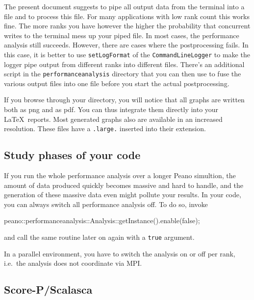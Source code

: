 \begin{remark}
The present document suggests to pipe all output data from the terminal into a
file and to process this file. 
For many applications with low rank count this works fine.
The more ranks you have however the higher the probability that concurrent
writes to the terminal mess up your piped file.
In most cases, the performance analysis still succeeds. 
However, there are cases where the postprocessing fails.
In this case, it is better to use \texttt{setLogFormat} of the
\texttt{CommandLineLogger} to make the logger pipe output from different ranks
into different files.
There's an additional script in the \texttt{performanceanalysis} directory that
you can then use to fuse the various output files into one file before you start
the actual postprocessing.
\end{remark}



\noindent
If you browse through your directory, you will notice that all graphs are
written both as png and as pdf. 
You can thus integrate them directly into your \LaTeX\ reports.
Most generated graphs also are available in an increased resolution. 
These files have a \texttt{.large.} inserted into their extension.


\subsection*{Study phases of your code}

If you run the whole performance analysis over a longer Peano simultion, the
amount of data produced quickly becomes massive and hard to handle, and the generation of
these massive data even might pollute your results. 
In your code, you can always switch all performance analysis off. 
To do so, invoke
\begin{c-code}
  peano::performanceanalysis::Analysis::getInstance().enable(false);
\end{c-code}

\noindent
and call the same routine later on again with a \texttt{true} argument.

In a parallel environment, you have to switch the analysis on or off per rank,
i.e.~the analysis does not coordinate via MPI. 

\subsection*{Score-P/Scalasca}

